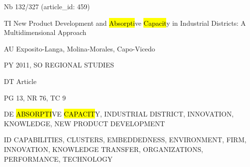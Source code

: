 \documentclass[a4paper]{article}
\begin{document}
\vspace*{-2cm}
Nb \tabto{0cm}132/327 (article\_id: 459)\par
TI \tabto{0cm}New Product Development and \hl{Absorpti}ve \hl{Capacit}y in Industrial Districts: A Multidimensional Approach\par
AU \tabto{0cm}Exposito-Langa, Molina-Morales, Capo-Vicedo\par
PY \tabto{0cm}2011, SO REGIONAL STUDIES\par
DT \tabto{0cm}Article\par
PG \tabto{0cm}13, NR 76, TC 9\par
DE \tabto{0cm}\hl{ABSORPTI}VE \hl{CAPACIT}Y, INDUSTRIAL DISTRICT, INNOVATION, KNOWLEDGE, NEW PRODUCT DEVELOPMENT\par
ID \tabto{0cm}CAPABILITIES, CLUSTERS, EMBEDDEDNESS, ENVIRONMENT, FIRM, INNOVATION, KNOWLEDGE TRANSFER, ORGANIZATIONS, PERFORMANCE, TECHNOLOGY\par
\end{document}
